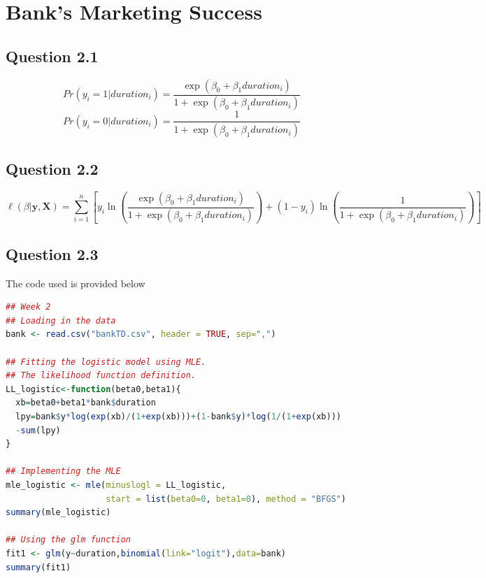 \documentclass[11pt]{article}
\begin{document}
{\section*{Bank's Marketing Success}
\subsection*{Question 2.1}
$$Pr(y_i = 1|duration_i) = \frac{\exp(\beta_0+\beta_1duration_i)}{1+\exp(\beta_0+\beta_1duration_i)}$$ 
$$Pr(y_i = 0|duration_i) = \frac{1}{1+\exp(\beta_0+\beta_1duration_i)}$$ 


\subsection*{Question 2.2}
$$\ell(\beta|\mathbf{y},\mathbf{X}) = \sum\limits_{i=1}^n \left[ y_i \ln{\left( \frac{\exp(\beta_0+\beta_1duration_i)}{1+\exp(\beta_0+\beta_1duration_i)}\right)} + (1-y_i) \ln{\left( \frac{1}{1+\exp(\beta_0+\beta_1duration_i)}\right)}\right]$$


\subsection*{Question 2.3}
The code used is provided below
\begin{lstlisting}[language=R]
## Week 2
## Loading in the data
bank <- read.csv("bankTD.csv", header = TRUE, sep=",")

## Fitting the logistic model using MLE.
## The likelihood function definition.
LL_logistic<-function(beta0,beta1){
  xb=beta0+beta1*bank$duration
  lpy=bank$y*log(exp(xb)/(1+exp(xb)))+(1-bank$y)*log(1/(1+exp(xb)))
  -sum(lpy)
}

## Implementing the MLE
mle_logistic <- mle(minuslogl = LL_logistic, 
                    start = list(beta0=0, beta1=0), method = "BFGS")
summary(mle_logistic)

## Using the glm function
fit1 <- glm(y~duration,binomial(link="logit"),data=bank)
summary(fit1)
\end{lstlisting}

}
\end{document}
